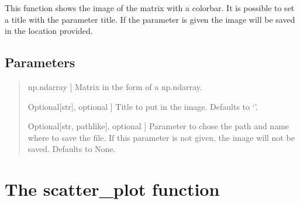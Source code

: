 \documentclass[letterpaper,10pt,english]{sphinxmanual}
\begin{document}
\begin{fulllineitems}
\label{\detokenize{index:hicanalysis.visualizegraph.plot_matrix}}
\pysigstartsignatures
{}
\pysigstopsignatures
\sphinxAtStartPar
This function shows the image of the matrix with a colorbar. 
It is possible to set a title with the parameter title.
If the parameter  is given the image will be saved in the location provided.


\subsection{Parameters}
\label{\detokenize{index:id17}}\begin{quote}
\begin{description}
\sphinxlineitem{matrix}{[}np.ndarray {]}
\sphinxAtStartPar
Matrix in the form of a np.ndarray.

\sphinxlineitem{title}{[}Optional{[}str{]}, optional  {]}
\sphinxAtStartPar
Title to put in the image. Defaults to ‘’.

\sphinxlineitem{savepath}{[}Optional{[}str, path\sphinxhyphen{}like{]}, optional {]}
\sphinxAtStartPar
Parameter to chose the path and name where to save the file. If this
parameter is not given, the image will not be saved. Defaults to None.

\end{description}
\end{quote}

\end{fulllineitems}



\section{The scatter\_plot function}
\label{\detokenize{index:the-scatter-plot-function}}
\end{document}
